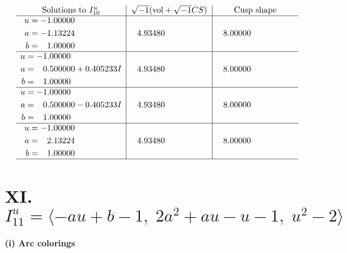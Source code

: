 \documentclass[1p]{elsarticle_modified}
\theoremstyle{definition}
\newcommand{\I}{\sqrt{-1}}
\begin{document}
$$\begin{array}{c|c|c}  
\text{Solutions to }I^u_{10}& \I (\text{vol} + \sqrt{-1}CS) & \text{Cusp shape}\\
 \hline 
\begin{aligned}
u &= -1.00000\phantom{ +0.000000I} \\
a &= -1.13224\phantom{ +0.000000I} \\
b &= \phantom{-}1.00000\phantom{ +0.000000I}\end{aligned}
 & \phantom{-}4.93480\phantom{ +0.000000I} & \phantom{-}8.00000\phantom{ +0.000000I} \\ \hline\begin{aligned}
u &= -1.00000\phantom{ +0.000000I} \\
a &= \phantom{-}0.500000 + 0.405233 I \\
b &= \phantom{-}1.00000\phantom{ +0.000000I}\end{aligned}
 & \phantom{-}4.93480\phantom{ +0.000000I} & \phantom{-}8.00000\phantom{ +0.000000I} \\ \hline\begin{aligned}
u &= -1.00000\phantom{ +0.000000I} \\
a &= \phantom{-}0.500000 - 0.405233 I \\
b &= \phantom{-}1.00000\phantom{ +0.000000I}\end{aligned}
 & \phantom{-}4.93480\phantom{ +0.000000I} & \phantom{-}8.00000\phantom{ +0.000000I} \\ \hline\begin{aligned}
u &= -1.00000\phantom{ +0.000000I} \\
a &= \phantom{-}2.13224\phantom{ +0.000000I} \\
b &= \phantom{-}1.00000\phantom{ +0.000000I}\end{aligned}
 & \phantom{-}4.93480\phantom{ +0.000000I} & \phantom{-}8.00000\phantom{ +0.000000I}\\
 \hline 
 \end{array}$$\newpage\newpage\renewcommand{\arraystretch}{1}
\centering \section*{XI. $I^u_{11}= \langle - a u+b-1,\;2 a^2+a u- u-1,\;u^2-2 \rangle$}
\flushleft \textbf{(i) Arc colorings}\\
\end{document}
